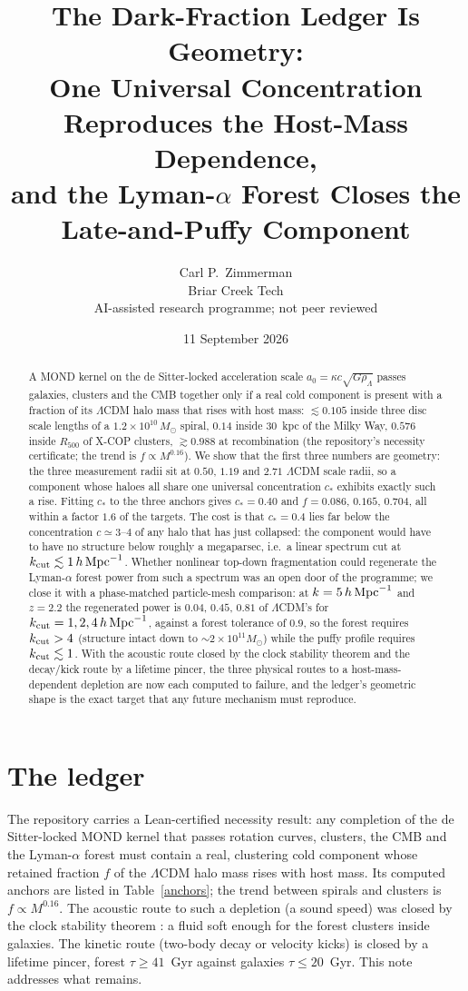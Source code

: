 \documentclass[11pt,letterpaper]{article}
\title{The Dark-Fraction Ledger Is Geometry:\\ One Universal Concentration Reproduces the Host-Mass Dependence,\\ and the Lyman-$\alpha$ Forest Closes the Late-and-Puffy Component}
\author{Carl P.\ Zimmerman\\ \small Briar Creek Tech\\ \small AI-assisted research programme; not peer reviewed}
\date{11 September 2026}
\begin{document}
\maketitle
\begin{abstract}
A MOND kernel on the de Sitter-locked acceleration scale $a_0=\kappa c\sqrt{G\rho_\Lambda}$ passes galaxies, clusters and the CMB together only if a real cold component is present with a fraction of its $\Lambda$CDM halo mass that rises with host mass: $\lesssim0.105$ inside three disc scale lengths of a $1.2\times10^{10}\,M_\odot$ spiral, $0.14$ inside 30~kpc of the Milky Way, $0.576$ inside $R_{500}$ of X-COP clusters, $\gtrsim0.988$ at recombination (the repository's necessity certificate; the trend is $f\propto M^{0.16}$). We show that the first three numbers are geometry: the three measurement radii sit at $0.50$, $1.19$ and $2.71$ $\Lambda$CDM scale radii, so a component whose haloes all share one universal concentration $c_*$ exhibits exactly such a rise. Fitting $c_*$ to the three anchors gives $c_*=0.40$ and $f=0.086$, $0.165$, $0.704$, all within a factor $1.6$ of the targets. The cost is that $c_*=0.4$ lies far below the concentration $c\simeq3$--$4$ of any halo that has just collapsed: the component would have to have no structure below roughly a megaparsec, i.e.\ a linear spectrum cut at $k_{\rm cut}\lesssim1\,h\,{\rm Mpc}^{-1}$. Whether nonlinear top-down fragmentation could regenerate the Lyman-$\alpha$ forest power from such a spectrum was an open door of the programme; we close it with a phase-matched particle-mesh comparison: at $k=5\,h\,{\rm Mpc}^{-1}$ and $z=2.2$ the regenerated power is $0.04$, $0.45$, $0.81$ of $\Lambda$CDM's for $k_{\rm cut}=1,2,4\,h\,{\rm Mpc}^{-1}$, against a forest tolerance of $0.9$, so the forest requires $k_{\rm cut}>4$ (structure intact down to $\sim2\times10^{11}M_\odot$) while the puffy profile requires $k_{\rm cut}\lesssim1$. With the acoustic route closed by the clock stability theorem and the decay/kick route by a lifetime pincer, the three physical routes to a host-mass-dependent depletion are now each computed to failure, and the ledger's geometric shape is the exact target that any future mechanism must reproduce.
\end{abstract}

\section{The ledger}
The repository \cite{repo} carries a Lean-certified necessity result: any completion of the de Sitter-locked MOND kernel that passes rotation curves, clusters, the CMB and the Lyman-$\alpha$ forest must contain a real, clustering cold component whose retained fraction $f$ of the $\Lambda$CDM halo mass rises with host mass. Its computed anchors are listed in Table~\ref{anchors}; the trend between spirals and clusters is $f\propto M^{0.16}$. The acoustic route to such a depletion (a sound speed) was closed by the clock stability theorem \cite{paper17}: a fluid soft enough for the forest clusters inside galaxies. The kinetic route (two-body decay or velocity kicks) is closed by a lifetime pincer, forest $\tau\ge41$~Gyr against galaxies $\tau\le20$~Gyr. This note addresses what remains.
\end{document}
